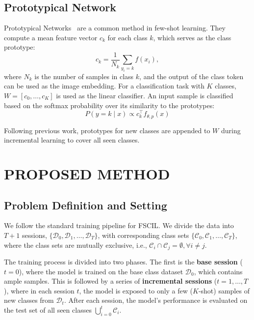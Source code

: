 ﻿\documentclass[letterpaper,journal]{IEEEtran}
\begin{document}
\subsection{Prototypical Network}
Prototypical Networks~\cite{snell2017} are a common method in few-shot learning. They compute a mean feature vector $c_k$ for each class $k$, which serves as the class prototype:
\begin{equation}
c_k=\frac{1}{N_k}\sum_{y_i=k} f(x_i),
\end{equation} where $N_k$ is the number of samples in class $k$, and the output of the class token can be used as the image embedding. For a classification task with $K$ classes, $W=[c_0,\ldots,c_K]$ is used as the linear classifier. An input sample is classified based on the softmax probability over its similarity to the prototypes:
\begin{equation}
P(y=k\mid x)\propto c_k^\top f_{\theta,p}(x)
\end{equation}

Following previous work, prototypes for new classes are appended to $W$ during incremental learning to cover all seen classes.

\section{PROPOSED METHOD}

\subsection{Problem Definition and Setting}
We follow the standard training pipeline for FSCIL. We divide the data into $T+1$ sessions, $\{\mathcal{D}_0,\mathcal{D}_1,\dots,\mathcal{D}_T\}$, with corresponding class sets $\{\mathcal{C}_0,\mathcal{C}_1,\dots,\mathcal{C}_T\}$, where the class sets are mutually exclusive, i.e., $\mathcal{C}_i \cap \mathcal{C}_j = \emptyset, \forall i \neq j$.

The training process is divided into two phases. The first is the \textbf{base session} ($t=0$), where the model is trained on the base class dataset $\mathcal{D}_0$, which contains ample samples. This is followed by a series of \textbf{incremental sessions} ($t=1, \dots, T$), where in each session $t$, the model is exposed to only a few ($K$-shot) samples of new classes from $\mathcal{D}_t$. After each session, the model's performance is evaluated on the test set of all seen classes $\bigcup_{i=0}^{t}\mathcal{C}_i$.
\end{document}
